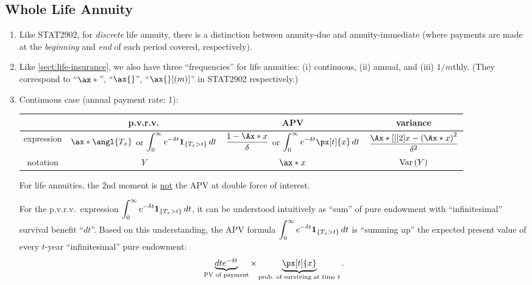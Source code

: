 \subsection{Whole Life Annuity}
\begin{enumerate}
\item Like STAT2902, for \emph{discrete} life annuity, there is a
distinction between annuity-due and annuity-immediate (where payments are made
at the \emph{beginning} and \emph{end} of each period covered, respectively).
\item Like \cref{sect:life-insurance}, we also have three ``frequencies'' for
life annuities: (i) continuous, (ii) annual, and (iii) \(1/m\)thly. (They
correspond to ``\(\ax*{}\)'', ``\(\ax{}\)'',  ``\(\ax{}[(m)]\)'' in
STAT2902 respectively.)
\item \label{it:cts-wl-annuity-fmlas}
Continuous case (annual payment rate: 1):

\begin{tabular}{cccc}
\toprule
&p.v.r.v.&APV&variance\\
\midrule
expression&\(\ax*{\angl{T_x}}\) or \(\displaystyle\int_{0}^{\infty}e^{-\delta t}\mathbf{1}_{\left\{T_x>t\right\}}\,dt\)
&\(\displaystyle \frac{1-\Ax*{x}}{\delta}\) or \(\displaystyle\int_{0}^{\infty}e^{-\delta t}\px[t]{x}\,dt\)
&\(\displaystyle \frac{\Ax*[][2]{x}-\qty(\Ax*{x})^2}{\delta^2}\)\\
notation&\(Y\)&\(\ax*{x}\)&\(\operatorname{Var}\qty(Y)\)\\
\bottomrule
\end{tabular}

\begin{warning}
For life annuities, the 2nd moment is \underline{not} the APV at double force
of interest.
\end{warning}

\begin{intuition}
For the p.v.r.v.\ expression \(\displaystyle\int_{0}^{\infty}e^{-\delta
t}\mathbf{1}_{\left\{T_x>t\right\}}\,dt\), it can be understood intuitively as ``sum'' of
pure endowment with ``infinitesimal'' survival benefit
 ``\(dt\)''. Based on this
understanding, the APV formula \(\displaystyle\int_{0}^{\infty}e^{-\delta
t}\mathbf{1}_{\left\{T_x>t\right\}}\,dt\) is ``summing up'' the expected present value of
 every \(t\)-year ``infinitesimal'' pure endowment:
\[
\underbrace{dte^{-\delta t}}_{\text{PV of payment}}\times\underbrace{\px[t]{x}}_{\text{prob.\ of surviving at time \(t\)}}.
\]
\end{intuition}


\end{enumerate}
